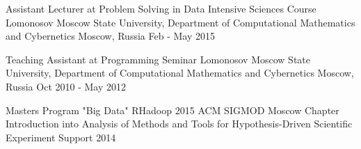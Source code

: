 \begin{cventries}
\cventry
    {Assistant Lecturer at Problem Solving in Data Intensive Sciences Course}
    {Lomonosov Moscow State University, Department of Computational Mathematics and Cybernetics}
    {Moscow, Russia}
    {Feb - May 2015}
    {
    }

\cventry
    {Teaching Assistant at Programming Seminar}
    {Lomonosov Moscow State University, Department of Computational Mathematics and Cybernetics}
    {Moscow, Russia}
    {Oct 2010 - May 2012}
    {
    }
\end{cventries}

\begin{cvhonors}
  \cvhonor
    {Masters Program "Big Data"}
    {RHadoop}
    {}
    {2015}
  \cvhonor
    {ACM SIGMOD Moscow Chapter}
    {Introduction into Analysis of Methods and Tools for Hypothesis-Driven Scientific Experiment Support}
    {}
    {2014}
  
\end{cvhonors}

